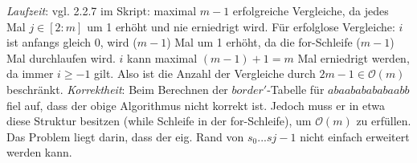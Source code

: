 \documentclass[a4paper,10pt,oneside,leqno]{scrartcl}
\begin{document}
\textit{Laufzeit}: vgl. 2.2.7 im Skript: maximal $m-1$ erfolgreiche Vergleiche, da jedes Mal $j\in [2 : m]$ um
1 erhöht und nie erniedrigt wird. Für erfolglose Vergleiche: $i$ ist anfangs gleich 0, wird ($m-1$)
Mal um 1 erhöht, da die for-Schleife ($m-1$) Mal durchlaufen wird. $i$ kann maximal $(m-1) + 1 = m$ Mal erniedrigt werden, da immer $i\geq -1$ gilt.
Also ist die Anzahl der Vergleiche durch $2m-1\in \mathcal{O}(m)$ beschränkt.\newline\newline
\textit{Korrektheit}: Beim Berechnen der $border'$-Tabelle für $abaababababaabb$ fiel auf, dass der obige Algorithmus nicht korrekt ist. Jedoch
muss er in etwa diese Struktur besitzen (while Schleife in der for-Schleife), um $\mathcal{O}(m)$ zu erfüllen. Das Problem liegt darin, dass der
eig. Rand von $s_0...s{j-1}$ nicht einfach erweitert werden kann.
\end{document}
